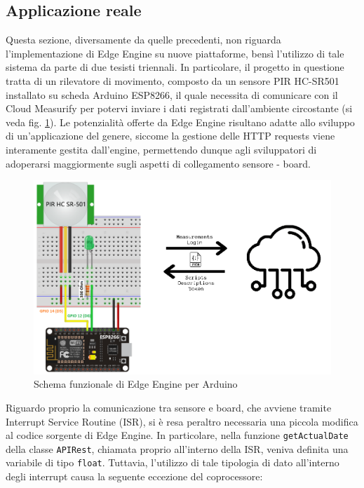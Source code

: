 \subsection{Applicazione reale}
Questa sezione, diversamente da quelle precedenti, non riguarda l’implementazione di Edge Engine su nuove piattaforme, bensì l’utilizzo di tale sistema da parte di due tesisti triennali. In particolare, il progetto in questione tratta di un rilevatore di movimento, composto da un sensore PIR HC-SR501 installato su scheda Arduino ESP8266, il quale necessita di comunicare con il Cloud Measurify per potervi inviare i dati registrati dall'ambiente circostante (si veda fig. \ref{esp8266cloud}). Le potenzialità offerte da Edge Engine risultano adatte allo sviluppo di un’applicazione del genere, siccome la gestione delle HTTP requests viene interamente gestita dall'engine, permettendo dunque agli sviluppatori di adoperarsi maggiormente sugli aspetti di collegamento sensore - board.

\begin{figure}[H]
	\centering
	\includegraphics[width=\linewidth]{pics/esp8266cloud}
	\caption{Schema funzionale di Edge Engine per Arduino}
	\label{esp8266cloud}
\end{figure}

Riguardo proprio la comunicazione tra sensore e board, che avviene tramite Interrupt Service Routine (ISR), si è resa peraltro necessaria una piccola modifica al codice sorgente di Edge Engine. In particolare, nella funzione \texttt{getActualDate} della classe \texttt{APIRest}, chiamata proprio all'interno della ISR, veniva definita una variabile di tipo \texttt{float}. Tuttavia, l'utilizzo di tale tipologia di dato all'interno degli interrupt causa la seguente eccezione del coprocessore:


